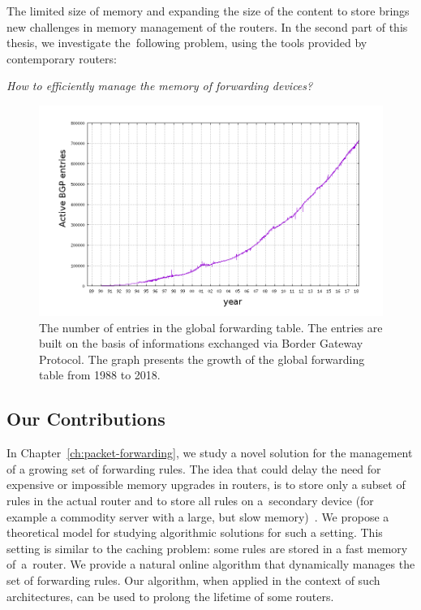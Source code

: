 The limited size of memory and expanding the size of the content to store brings new challenges in memory management of the routers.
In the second part of this thesis, we investigate the~following problem, using the tools provided by contemporary routers:
\begin{center}
  \emph{How to efficiently manage the memory of forwarding devices?}
\end{center}

\begin{figure}[t]
\centering
\includegraphics[width=0.79\columnwidth]{figs/bgp-entries.png}
\caption{The number of entries in the global forwarding table. The entries are built on the basis of informations exchanged via Border Gateway Protocol. The graph presents the growth of the global forwarding table from 1988 to 2018.}\label{fig:bgp-entries}
\end{figure}


\subsection{Our Contributions}

In Chapter~\ref{ch:packet-forwarding}, we study a novel solution for the management of a growing set of forwarding rules.
The idea that could delay the need for expensive or impossible memory upgrades in routers, is to store
only a subset of rules in the actual router and to store all rules on a~secondary
device (for example a commodity server with a large, but slow
memory)~\cite{cacheflow,route-caching-flat,prefix-caching,fib-caching-non-overlapping,fibium-zipf}.
We propose a theoretical model for studying algorithmic solutions for such a setting.
This setting is similar to the caching problem: some rules are stored in a fast memory of~a~router.
We provide a natural online algorithm that dynamically manages the set of forwarding rules.
Our 
algorithm, when applied in the context of such architectures, can 
be used to prolong the lifetime of some routers.


